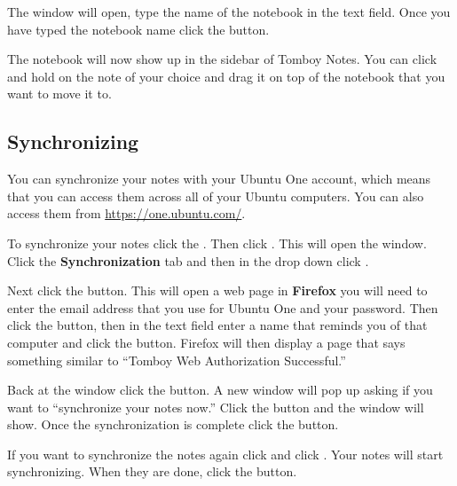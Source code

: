 The  window will open, type the name of the notebook 
in the  text field. Once you have typed the notebook name
click the  button.

The notebook will now show up in the sidebar of Tomboy Notes. You can click and hold 
on the note of your choice and drag it on top of the notebook that you want to move it to.

\subsection{Synchronizing}

You can synchronize your notes with your Ubuntu One account, which means that you 
can access them across all of your Ubuntu computers. You can also access them from 
\url{https://one.ubuntu.com/}.

To synchronize your notes click the . Then click .
This will open the  window. Click the \textbf{Synchronization} 
tab and then in the  drop down click . 

Next click the  button. This will open a web page in 
\textbf{Firefox} you will need to enter the email address that you use for Ubuntu 
One and your password. Then click the  button, then in the 
text field enter a name that reminds you of that computer and click the 
button. Firefox will then display a page that says something similar to ``Tomboy Web 
Authorization Successful.''

Back at the  window click the  button.
A new window will pop up asking if you want to ``synchronize your notes now.''
Click the  button and the  window 
will show. Once the synchronization is complete click the  button.

If you want to synchronize the notes again click  and click .
Your notes will start synchronizing. When they are done, click the 
button.
